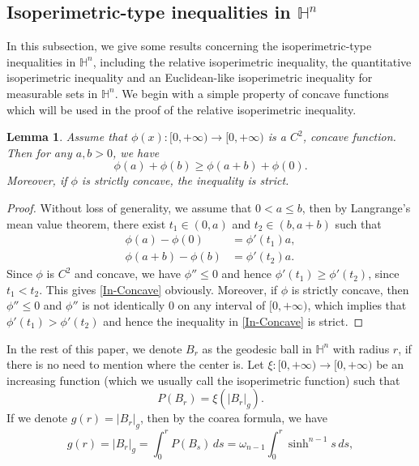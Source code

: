 \documentclass[11pt,reqno]{amsart}
\newtheorem{lem}[thm]{Lemma}
\theoremstyle{definition}
\theoremstyle{remark}
\numberwithin{equation}{section}
\renewcommand{\(}{\left(}
\renewcommand{\)}{\right)}
\renewcommand{\-}{\overline}
\begin{document}
\subsection{Isoperimetric-type inequalities in $\mathbb{H}^n$} In this subsection, we give some results concerning the isoperimetric-type inequalities in $\mathbb{H}^n$, including the relative isoperimetric inequality, the quantitative isoperimetric inequality and an Euclidean-like isoperimetric inequality for measurable sets in $\mathbb{H}^n$. We begin with a simple property of concave functions which will be used in the proof of the relative isoperimetric inequality.
\begin{lem}\label{Lem-concave}
	Assume that $\phi(x):[0,+\infty)\to[0,+\infty)$ is a $C^2$, concave function. Then for any $a,b>0$, we have 
	\begin{equation}\label{In-Concave}
		\phi(a)+\phi(b)\geq \phi(a+b)+\phi(0).
	\end{equation}
Moreover, if $\phi$ is strictly concave, the inequality is strict.
\end{lem}
\begin{proof}
	Without loss of generality, we assume that $0<a\leq b$, then by Langrange's mean value theorem, there exist $t_1\in(0,a)$ and $t_2\in(b,a+b)$ such that 
	\begin{align}
		\phi(a)-\phi(0)&=\phi'(t_1)a,\label{Eq-con1}\\
		\phi(a+b)-\phi(b)&=\phi'(t_2)a.\label{Eq-con2}
	\end{align}
	Since $\phi$ is $C^2$ and concave, we have $\phi''\leq 0$ and hence $\phi'(t_1)\geq \phi'(t_2)$, since $t_1<t_2$. This gives \eqref{In-Concave} obviously.  Moreover, if $\phi$ is strictly concave, then $\phi''\leq 0$ and $\phi''$ is not identically 0 on any interval of $[0,+\infty)$, which implies that $\phi'(t_1)> \phi'(t_2)$ and hence the inequality in  \eqref{In-Concave} is strict.
\end{proof}
In the rest of this paper, we denote $B_r$ as the geodesic ball in $\mathbb{H}^n$ with radius $r$, if there is no need to mention where the center is. Let $\xi:[0,+\infty)\to[0,+\infty)$ be an increasing function (which we usually call the isoperimetric function) such that 
\begin{equation}\label{Defn-xi}
	P(B_r)=\xi(|B_r|_g).
\end{equation}
If we denote $g(r)=|B_r|_g$, then by the coarea formula, we have
\begin{equation}\label{Eq-Volume}
	g(r)=|B_r|_g=\int_0^r{P(B_s)}\,ds=\omega_{n-1}\int_{0}^r{\sinh^{n-1}s}\,ds,
\end{equation}
\end{document}
